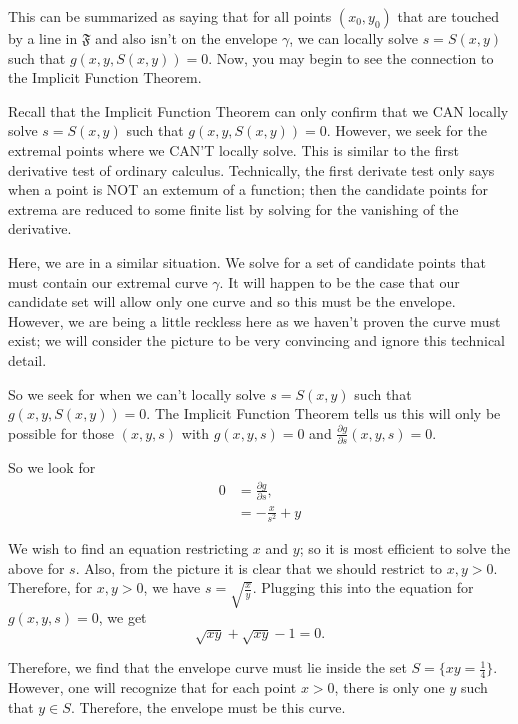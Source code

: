 This can be summarized as saying that for all points \((x_0, y_0)\) that are touched by a line in \(\mathfrak F\) and also isn't on the envelope \(\gamma\), we can locally solve \(s = S(x,y)\) such that \(g(x, y, S(x, y)) = 0\). Now, you may begin to see the connection to the Implicit Function Theorem.

Recall that the Implicit Function Theorem can only confirm that we CAN locally solve \(s = S(x,y)\) such that \(g(x, y, S(x, y)) = 0\). However, we seek for the extremal points where we CAN'T locally solve. This is similar to the first derivative test of ordinary calculus. Technically, the first derivate test only says when a point is NOT an extemum of a function; then the candidate points for extrema are reduced to some finite list by solving for the vanishing of the derivative.

Here, we are in a similar situation. We solve for a set of candidate points that must contain our extremal curve \(\gamma\). 
It will happen to be the case that our candidate set will allow only one curve and so this must be the envelope.
However, we are being a little reckless here as we haven't proven the curve must exist; we will consider the picture to be very convincing and ignore this technical detail. 

So we seek for when we can't locally solve \(s = S(x,y)\) such that \(g(x, y, S(x, y)) = 0\). The Implicit Function Theorem tells us this will only be possible for those \((x,y,s)\) with \(g(x,y,s) = 0\) and \(\frac{\partial g}{\partial s} (x, y, s) = 0\).

So we look for
\begin{align}
0 & = \frac{\partial g}{\partial s}, \\
&  = -\frac{x}{s^2} + y
\end{align}

We wish to find an equation restricting \(x\) and \(y\); so it is most efficient to solve the above for \(s\). 
Also, from the picture it is clear that we should restrict to \(x, y > 0\). 
Therefore, for \(x, y > 0\), we have \(s = \sqrt{\frac{x}{y}}\). Plugging this into the equation for \(g(x, y, s) = 0\), we get 
\begin{equation}
\sqrt{xy} + \sqrt{xy} - 1 = 0.
\end{equation} 

Therefore, we find that the envelope curve must lie inside the set \(S = \{xy = \frac{1}{4}\}\). However, one will recognize that for each point \(x > 0\), there is only one \(y\) such that \(y \in S\). Therefore, the envelope must be this curve.

